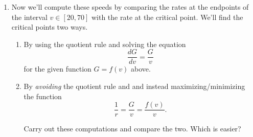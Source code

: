 \documentclass{ximera}
\begin{document}
\begin{question}
\begin{explanation}
\begin{enumerate}
Explain now how to use the slider $v$ in the above graph to approximate the speeds at which the car burns gas at the miniumum/maximum rates. One of the apprpoximations should be exact.

\begin{freeResponse}
\end{freeResponse}

\item Now we'll compute these speeds by comparing the rates at the endpoints of the interval $v\in [20,70]$ with the rate at the critical point. We'll find the critical points two ways. 

\begin{enumerate}

\item By using the quotient rule and solving the equation
\[
  \frac{dG}{dv} = \frac{G}{v}
\]
for the given function $G=f(v)$ above.

\item By \emph{avoiding} the quotient rule and and instead maximizing/minimizing the function
\[
  \frac{1}{r} = \frac{G}{v} = \frac{f(v)}{v} .       
\]

Carry out these computations and compare the two. Which is easier?
\begin{freeResponse}
\end{freeResponse}

\end{enumerate}

\end{enumerate}

\end{explanation}

\end{question}
\end{document}
